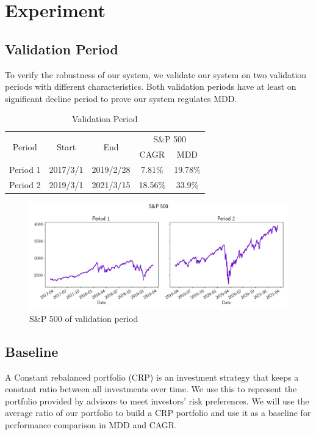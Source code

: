 \section{Experiment}
\subsection{Validation Period}
To verify the robustness of our system, we validate our system on two validation periods with different characteristics. Both validation periods have at least on significant decline period to prove our system regulates MDD.
\begin{table}[htb]
    \centering
    \begin{tabular}{||c|c|c|c|c||}
    \hline \hline
    \multirow{2}{*}{Period} &
    \multirow{2}{*}{Start} &
    \multirow{2}{*}{End} &
    \multicolumn{2}{c|}{S\&P 500} \\ 
    \cline{4-5} &{} &{} & CAGR & MDD \\ \hline \hline
    Period 1 & 2017/3/1 & 2019/2/28 & 7.81\% & 19.78\% \\ \hline
    Period 2 & 2019/3/1 & 2021/3/15 & 18.56\% & 33.9\% \\    
    \hline \hline
    \end{tabular}
    \caption{Validation Period}
    \label{tab:validation_period}
\end{table}
\begin{figure}
    \centering
    \includegraphics[width=15cm]{images/sp500.png}
    \caption{S\&P 500 of validation period}
    \label{fig:my_label}
\end{figure}



\subsection{Baseline}
A Constant rebalanced portfolio (CRP) is an investment strategy that keeps a constant ratio between all investments over time. We use this to represent the portfolio provided by advisors to meet investors' risk preferences. We will use the average ratio of our portfolio to build a CRP portfolio and use it as a baseline for performance comparison in MDD and CAGR.
